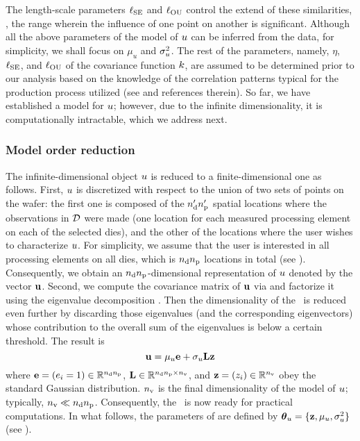 The length-scale parameters $\ell_{\text{SE}}$ and $\ell_{\text{OU}}$ control the extend of these similarities, \ie, the range wherein the influence of one point on another is significant.
Although all the above parameters of the model of $u$ can be inferred from the data, for simplicity, we shall focus on $\mu_u$ and $\sigma_u^2$.
The rest of the parameters, namely, $\eta$, $\ell_{\text{SE}}$, and $\ell_{\text{OU}}$ of the covariance function $\fCov$, are assumed to be determined prior to our analysis based on the knowledge of the correlation patterns typical for the production process utilized (see \cite{marzouk2009} and references therein).
So far, we have established a model for $u$; however, due to the infinite dimensionality, it is computationally intractable, which we address next.

\subsubsection{Model order reduction} 
The infinite-dimensional object $u$ is reduced to a finite-dimensional one as follows.
First, $u$ is discretized with respect to the union of two sets of points on the wafer: the first one is composed of the ${n_\text{d}'} {n_\text{p}'}$ spatial locations where the observations in $\mathcal{D}$ were made (one location for each measured processing element on each of the selected dies), and the other of the locations where the user wishes to characterize $u$.
For simplicity, we assume that the user is interested in all processing elements on all dies, which is ${n_\text{d}} {n_\text{p}}$ locations in total (see ). Consequently, we obtain an ${n_\text{d}} {n_\text{p}}$-dimensional representation of $u$ denoted by the vector $\mathbf{u}$.
Second, we compute the covariance matrix of $\mathbf{u}$ via  and factorize it using the eigenvalue decomposition \cite{press2007}.
Then the dimensionality of the \qoi\ is reduced even further by discarding those eigenvalues (and the corresponding eigenvectors) whose contribution to the overall sum of the eigenvalues is below a certain threshold.
The result is
\begin{equation} \elabel{kl-approximation}
  \vu = \mu_\u \vI + \sigma_\u \mKL \vz
\end{equation}
where $\mathbf{e} = (e_i = 1) \in \mathbb{R}^{{n_\text{d}} {n_\text{p}}}$, $\mathbf{L} \in \mathbb{R}^{{n_\text{d}} {n_\text{p}} \times {n_\text{v}}}$, and $\mathbf{z} = (z_i) \in \mathbb{R}^{n_\text{v}}$ obey the standard Gaussian distribution.
${n_\text{v}}$ is the final dimensionality of the model of $u$; typically, ${n_\text{v}} \ll {n_\text{d}} {n_\text{p}}$.
Consequently, the \qoi\ is now ready for practical computations.
In what follows, the parameters of  are defined by ${\boldsymbol\theta}_u = \{ \mathbf{z}, \mu_u, \sigma^2_u \}$ (see ).


